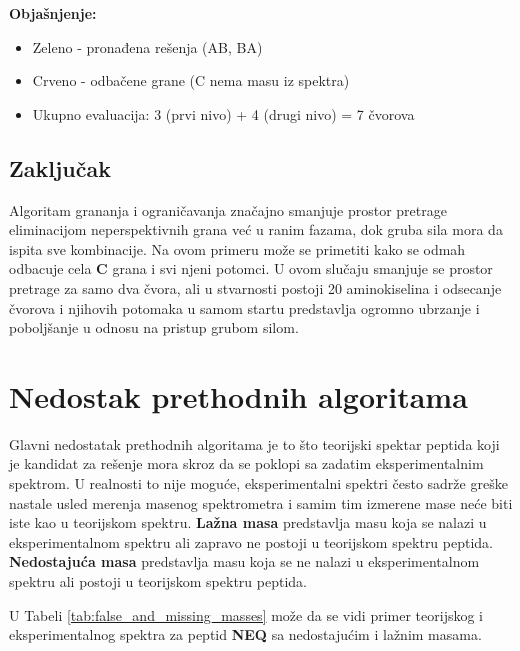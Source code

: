 \documentclass[12pt,oneside]{memoir}
\begin{document}
\textbf{Objašnjenje:}
\begin{itemize}
    \item \textcolor{green!50!black}{Zeleno} - pronađena rešenja (AB, BA)
    \item \textcolor{red!50!black}{Crveno} - odbačene grane (C nema masu iz spektra)
    \item Ukupno evaluacija: 3 (prvi nivo) + 4 (drugi nivo) = 7 čvorova
\end{itemize}

\subsection{Zaključak}

Algoritam grananja i ograničavanja značajno smanjuje prostor pretrage eliminacijom neperspektivnih grana već u ranim fazama, dok gruba sila mora da ispita sve kombinacije.
Na ovom primeru može se primetiti kako se odmah odbacuje cela \textbf{C} grana i svi njeni potomci. U ovom slučaju smanjuje se prostor pretrage za samo dva čvora, ali u stvarnosti postoji 20 aminokiselina i odsecanje čvorova i njihovih potomaka u samom startu predstavlja ogromno ubrzanje i poboljšanje u odnosu na pristup grubom silom.

\section{Nedostak prethodnih algoritama}

Glavni nedostatak prethodnih algoritama je to što teorijski spektar peptida koji je kandidat za rešenje mora skroz da se poklopi sa zadatim eksperimentalnim spektrom. U realnosti to nije moguće, eksperimentalni spektri često sadrže greške nastale usled merenja masenog spektrometra i samim tim izmerene mase neće biti iste kao u teorijskom spektru.
\textbf{Lažna masa} predstavlja masu koja se nalazi u eksperimentalnom spektru ali zapravo ne postoji u teorijskom spektru peptida.
\textbf{Nedostajuća masa} predstavlja masu koja se ne nalazi u eksperimentalnom spektru ali postoji u teorijskom spektru peptida.

U Tabeli \ref{tab:false_and_missing_masses} može da se vidi primer teorijskog i eksperimentalnog spektra za peptid \textbf{NEQ} sa nedostajućim i lažnim masama.
\end{document}
